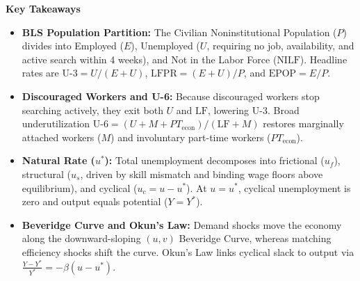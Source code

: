 \documentclass[11pt, a4paper]{article}
\newcommand{\boxheader}[2]{\textbf{\textcolor{#1}{#2}}\par\smallskip}
\begin{document}
\begin{takeaways}
\boxheader{CourseTeal}{Key Takeaways}
\begin{itemize}[leftmargin=1.4em, itemsep=3pt, topsep=2pt]
  \item \textbf{BLS Population Partition:} The Civilian Noninstitutional Population ($P$) divides into Employed ($E$), Unemployed ($U$, requiring no job, availability, and active search within 4 weeks), and Not in the Labor Force ($\text{NILF}$). Headline rates are $\text{U-3} = U / (E+U)$, $\text{LFPR} = (E+U)/P$, and $\text{EPOP} = E/P$.
  \item \textbf{Discouraged Workers and U-6:} Because discouraged workers stop searching actively, they exit both $U$ and $\text{LF}$, lowering U-3. Broad underutilization $\text{U-6} = (U + M + PT_{\text{econ}}) / (\text{LF} + M)$ restores marginally attached workers ($M$) and involuntary part-time workers ($PT_{\text{econ}}$).
  \item \textbf{Natural Rate ($u^*$):} Total unemployment decomposes into frictional ($u_f$), structural ($u_s$, driven by skill mismatch and binding wage floors above equilibrium), and cyclical ($u_c = u - u^*$). At $u = u^*$, cyclical unemployment is zero and output equals potential ($Y = Y^*$).
  \item \textbf{Beveridge Curve and Okun's Law:} Demand shocks move the economy along the downward-sloping $(u, v)$ Beveridge Curve, whereas matching efficiency shocks shift the curve. Okun's Law links cyclical slack to output via $\frac{Y - Y^*}{Y^*} = -\beta(u - u^*)$.
\end{itemize}
\end{takeaways}
\end{document}
